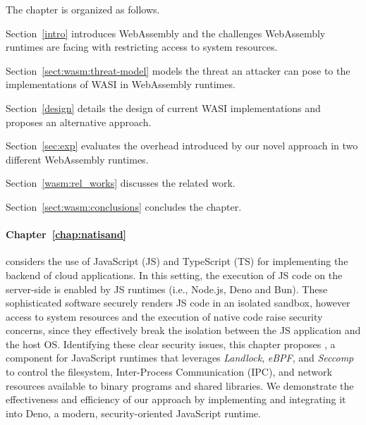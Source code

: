 \smallskip
\noindent The chapter is organized as follows.
\begin{compactitem}
    \item Section~\ref{intro} introduces WebAssembly and the
     challenges WebAssembly runtimes are facing with restricting
     access to system resources.
    \item Section~\ref{sect:wasm:threat-model} models the threat
     an attacker can pose to the implementations of WASI in
     WebAssembly runtimes.
    \item Section~\ref{design} details the design of current
     WASI implementations and proposes an alternative approach.
    \item Section~\ref{sec:exp} evaluates the overhead introduced by
     our novel approach in two different WebAssembly runtimes.
    \item Section~\ref{wasm:rel_works} discusses the related work.
    \item Section~\ref{sect:wasm:conclusions} concludes the chapter.
\end{compactitem}
\medskip

\paragraph*{Chapter~\ref{chap:natisand}} considers the use of
JavaScript (JS) and TypeScript (TS) for implementing the backend of
cloud applications. In this setting, the execution of JS code on the
server-side is enabled by JS runtimes (i.e., Node.js, Deno and Bun).
These sophisticated software securely renders JS code in an isolated
sandbox, however access to system resources and the execution of
native code raise security concerns, since they effectively break the
isolation between the JS application and the host OS. Identifying these
clear security issues, this chapter proposes \natisand, a component for
JavaScript runtimes that leverages {\em Landlock}, {\em eBPF}, and
{\em Seccomp} to control the filesystem, Inter-Process Communication
(IPC), and network resources available to binary programs and shared
libraries. We demonstrate the effectiveness and efficiency of our
approach by implementing and integrating it into Deno, a modern,
security-oriented JavaScript runtime.

